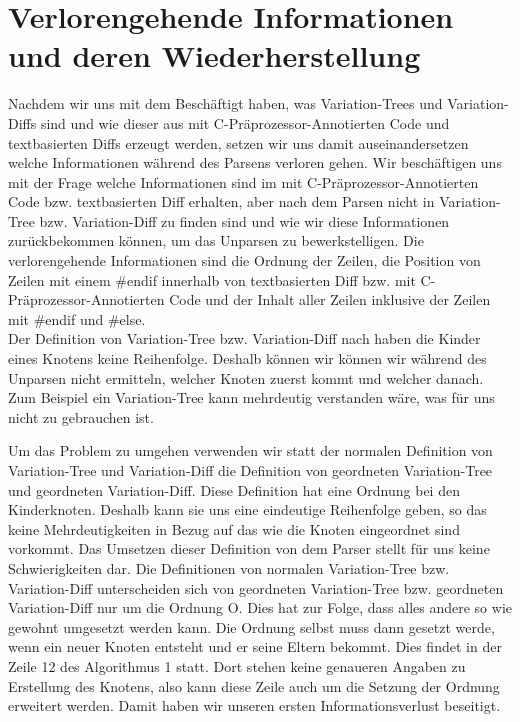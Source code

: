 \section{Verlorengehende Informationen und deren Wiederherstellung}

Nachdem wir uns mit dem Beschäftigt haben, was Variation-Trees und Variation-Diffs sind und wie dieser aus mit C-Präprozessor-Annotierten Code und textbasierten Diffs erzeugt werden, setzen wir uns damit auseinandersetzen welche Informationen während des Parsens verloren gehen. Wir beschäftigen uns mit der Frage welche Informationen sind im mit C-Präprozessor-Annotierten Code bzw. textbasierten Diff erhalten, aber nach dem Parsen nicht in Variation-Tree bzw. Variation-Diff zu finden sind und wie wir diese Informationen zurückbekommen können, um das Unparsen zu bewerkstelligen. Die verlorengehende Informationen sind die Ordnung der Zeilen, die Position von  Zeilen mit einem \#endif innerhalb von textbasierten Diff bzw. mit C-Präprozessor-Annotierten Code und der Inhalt aller Zeilen inklusive der Zeilen mit \#endif und \#else.\\

Der Definition von Variation-Tree bzw. Variation-Diff nach haben die Kinder eines Knotens keine Reihenfolge. Deshalb können wir können wir während des Unparsen nicht ermitteln, welcher Knoten zuerst kommt und welcher danach. Zum Beispiel ein Variation-Tree kann mehrdeutig verstanden wäre, was für uns nicht zu gebrauchen ist.
\begin{figure}[H]
	\centering
\end{figure}
Um das Problem zu umgehen verwenden wir statt der normalen Definition von Variation-Tree und Variation-Diff die Definition von geordneten Variation-Tree und geordneten Variation-Diff. Diese Definition hat eine Ordnung bei den Kinderknoten. Deshalb kann sie uns eine eindeutige Reihenfolge geben, so das keine Mehrdeutigkeiten in Bezug auf das wie die Knoten eingeordnet sind vorkommt. Das Umsetzen dieser Definition von dem Parser stellt für uns keine Schwierigkeiten dar. Die Definitionen von normalen Variation-Tree bzw. Variation-Diff unterscheiden sich von geordneten Variation-Tree bzw. geordneten Variation-Diff nur um die Ordnung O. Dies hat zur Folge, dass alles andere so wie gewohnt umgesetzt werden kann. Die Ordnung selbst muss dann gesetzt werde, wenn ein neuer Knoten entsteht und er seine Eltern bekommt. Dies findet in der Zeile 12 des Algorithmus 1 statt. Dort stehen keine genaueren Angaben zu Erstellung des Knotens, also kann diese Zeile auch um die Setzung der Ordnung erweitert werden. Damit haben wir unseren ersten Informationsverlust beseitigt.\\

